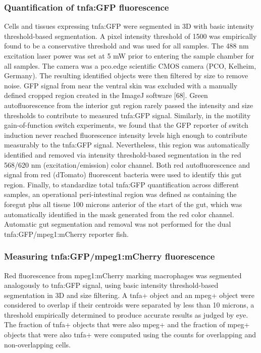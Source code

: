\subsubsection{Quantification of tnfa:GFP fluorescence}
Cells and tissues expressing tnfa:GFP were segmented in 3D with basic intensity threshold-based segmentation. A pixel intensity threshold of 1500 was empirically found to be a conservative threshold and was used for all samples. The 488 nm excitation laser power was set at 5 mW prior to entering the sample chamber for all samples. The camera was a pco.edge scientific CMOS camera (PCO, Kelheim, Germany). The resulting identified objects were then filtered by size to remove noise. GFP signal from near the ventral skin was excluded with a manually defined cropped region created in the ImageJ software [68]. Green autofluorescence from the interior gut region rarely passed the intensity and size thresholds to contribute to measured tnfa:GFP signal. Similarly, in the motility gain-of-function switch experiments, we found that the GFP reporter of switch induction never reached fluorescence intensity levels high enough to contribute measurably to the tnfa:GFP signal. Nevertheless, this region was automatically identified and removed via intensity threshold-based segmentation in the red 568/620 nm (excitation/emission) color channel. Both red autofluorescence and signal from red (dTomato) fluorescent bacteria were used to identify this gut region. Finally, to standardize total tnfa:GFP quantification across different samples, an operational peri-intestinal region was defined as containing the foregut plus all tissue 100 microns anterior of the start of the gut, which was automatically identified in the mask generated from the red color channel. Automatic gut segmentation and removal was not performed for the dual tnfa:GFP/mpeg1:mCherry reporter fish.

\subsubsection{Measuring tnfa:GFP/mpeg1:mCherry fluorescence}
Red fluorescence from mpeg1:mCherry marking macrophages was segmented analogously to tnfa:GFP signal, using basic intensity threshold-based segmentation in 3D and size filtering. A tnfa+ object and an mpeg+ object were considered to overlap if their centroids were separated by less than 10 microns, a threshold empirically determined to produce accurate results as judged by eye. The fraction of tnfa+ objects that were also mpeg+ and the fraction of mpeg+ objects that were also tnfa+ were computed using the counts for overlapping and non-overlapping cells.


